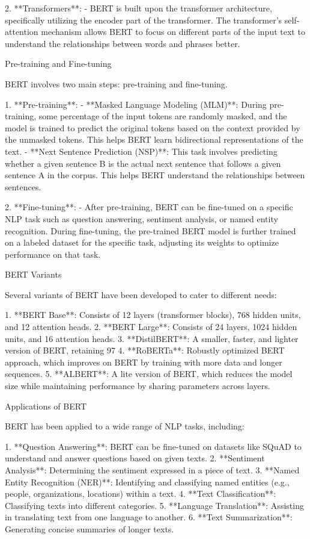 2. **Transformers**:
   - BERT is built upon the transformer architecture, specifically utilizing the encoder part of the transformer. The transformer’s self-attention mechanism allows BERT to focus on different parts of the input text to understand the relationships between words and phrases better.

 Pre-training and Fine-tuning

BERT involves two main steps: pre-training and fine-tuning.

1. **Pre-training**:
   - **Masked Language Modeling (MLM)**: During pre-training, some percentage of the input tokens are randomly masked, and the model is trained to predict the original tokens based on the context provided by the unmasked tokens. This helps BERT learn bidirectional representations of the text.
   - **Next Sentence Prediction (NSP)**: This task involves predicting whether a given sentence B is the actual next sentence that follows a given sentence A in the corpus. This helps BERT understand the relationships between sentences.

2. **Fine-tuning**:
   - After pre-training, BERT can be fine-tuned on a specific NLP task such as question answering, sentiment analysis, or named entity recognition. During fine-tuning, the pre-trained BERT model is further trained on a labeled dataset for the specific task, adjusting its weights to optimize performance on that task.

 BERT Variants

Several variants of BERT have been developed to cater to different needs:

1. **BERT Base**: Consists of 12 layers (transformer blocks), 768 hidden units, and 12 attention heads.
2. **BERT Large**: Consists of 24 layers, 1024 hidden units, and 16 attention heads.
3. **DistilBERT**: A smaller, faster, and lighter version of BERT, retaining 97%
4. **RoBERTa**: Robustly optimized BERT approach, which improves on BERT by training with more data and longer sequences.
5. **ALBERT**: A lite version of BERT, which reduces the model size while maintaining performance by sharing parameters across layers.

 Applications of BERT

BERT has been applied to a wide range of NLP tasks, including:

1. **Question Answering**: BERT can be fine-tuned on datasets like SQuAD to understand and answer questions based on given texts.
2. **Sentiment Analysis**: Determining the sentiment expressed in a piece of text.
3. **Named Entity Recognition (NER)**: Identifying and classifying named entities (e.g., people, organizations, locations) within a text.
4. **Text Classification**: Classifying texts into different categories.
5. **Language Translation**: Assisting in translating text from one language to another.
6. **Text Summarization**: Generating concise summaries of longer texts.

